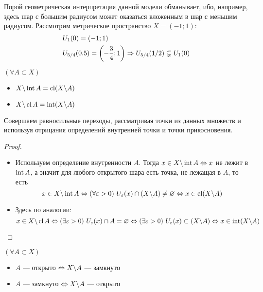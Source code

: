 \begin{example}
	Порой геометрическая интерпретация данной модели
	обманывает, ибо, например, здесь шар с большим
	радиусом может оказаться вложенным в шар с меньшим радиусом.
	Рассмотрим метрическое пространство $X = (-1; 1)$:
	\begin{align*}
		&{U_{1}(0) = (-1; 1)}
		\\
		&{U_{5/4}(0.5) = \left(-\frac{3}{4}; 1\right)
		\Rightarrow U_{5/4}(1/2) \subsetneq U_{1}(0)}
	\end{align*}
\end{example}

\begin{lemma}
	$(\forall A \subset X)$
	\begin{itemize}
		\item $X \backslash \operatorname{int} A = \operatorname{cl}(X \backslash A)$
		
		\item $X \backslash \operatorname{cl} A = \operatorname{int}(X \backslash A)$
	\end{itemize}
\end{lemma}

\begin{idea}
	Совершаем равносильные переходы, рассматривая точки
	из данных множеств и используя
	отрицания определений внутренней точки и точки прикосновения.
\end{idea}

\begin{proof}~
	\begin{itemize}
		\item Используем определение внутренности $A$.
			Тогда $x \in X \backslash \operatorname{int} A \Leftrightarrow x$ не
			лежит в $\operatorname{int} A$, а значит для любого открытого
			шара есть точка, не лежащая в $A$, то есть
			\[
				x \in X \backslash \operatorname{int} A \Leftrightarrow
				(\forall \varepsilon > 0)\ U_\varepsilon(x) \cap
				(X \backslash A) \neq \varnothing \Leftrightarrow x \in \operatorname{cl}(X \backslash A)
			\]
			
		\item Здесь по аналогии:
			\[
				x \in X \backslash \operatorname{cl} A \Leftrightarrow
				(\exists \varepsilon > 0)\ U_\varepsilon(x) \cap A
				= \varnothing \Leftrightarrow
				(\exists \varepsilon > 0)\ U_\varepsilon(x) \subset (X
				\backslash A) \Leftrightarrow x \in \operatorname{int} (X \backslash A)
			\]
	\end{itemize}
\end{proof}

\begin{theorem} \label{additionInverse}
	$(\forall A \subset X)$
	\begin{itemize}
		\item $A$ --- открыто $\Leftrightarrow X \backslash A$ --- замкнуто
		\item $A$ --- замкнуто $\Leftrightarrow X \backslash A$ --- открыто
	\end{itemize}
\end{theorem}

